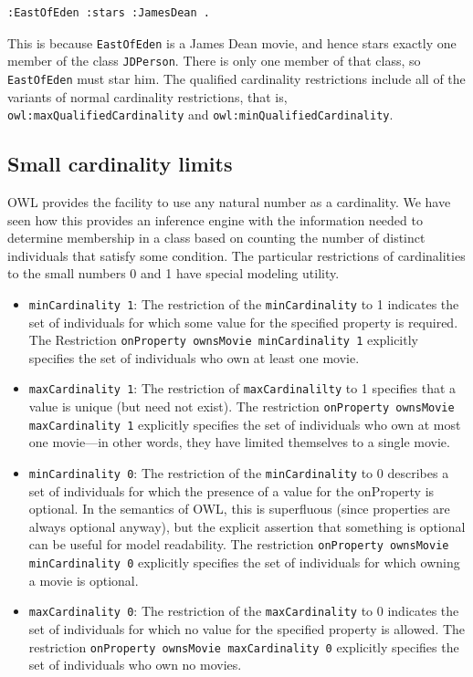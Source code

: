 \begin{lstlisting}
:EastOfEden :stars :JamesDean .
\end{lstlisting}

This is because \texttt{EastOfEden} is a James Dean movie, and hence stars
exactly one member of the class \texttt{JDPerson}. There is only one member of
that class, so \texttt{EastOfEden} must star him. The qualified cardinality
restrictions include all of the variants of normal cardinality
restrictions, that is, \texttt{owl:maxQualifiedCardinality} and
\texttt{owl:minQualifiedCardinality}.

\subsection{Small cardinality limits}

OWL provides the facility to use any natural number as a cardinality. We
have seen how this provides an inference engine with the information
needed to determine membership in a class based on counting the number
of distinct individuals that satisfy some condition. The particular
restrictions of cardinalities to the small numbers 0 and 1 have
special modeling utility.

\begin{itemize}
\item \texttt{minCardinality 1}: The restriction of the \texttt{minCardinality} to 1 indicates
the set of individuals for which some value for the specified property
is required. The Restriction \texttt{onProperty ownsMovie minCardinality 1}
explicitly specifies the set of individuals who own at least one movie.

\item \texttt{maxCardinality 1}: The restriction of \texttt{maxCardinalilty} to 1 specifies that
a value is unique (but need not exist). The restriction \texttt{onProperty
ownsMovie maxCardinality 1} explicitly specifies the set of individuals
who own at most one movie---in other words, they have limited themselves
to a single movie.

\item \texttt{minCardinality 0}: The restriction of the \texttt{minCardinality} to 0 describes a
set of individuals for which the presence of a value for the onProperty
is optional. In the semantics of OWL, this is superfluous (since
properties are always optional anyway), but the explicit assertion that
something is optional can be useful for model readability. The
restriction \texttt{onProperty ownsMovie minCardinality 0} explicitly specifies
the set of individuals for which owning a movie is optional.

\item \texttt{maxCardinality 0}: The restriction of the \texttt{maxCardinality} to 0 indicates
the set of individuals for which no value for the specified property is
allowed. The restriction \texttt{onProperty ownsMovie maxCardinality 0}
explicitly specifies the set of individuals who own no movies.
\end{itemize}


